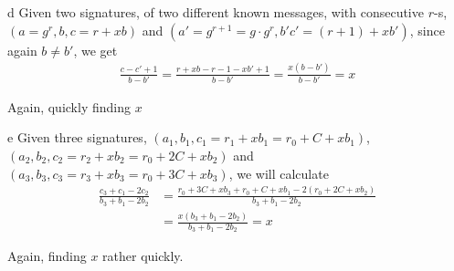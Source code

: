 \documentclass{article}
\begin{document}
\begin{paragraph}
    d Given two signatures, of two different known messages, with consecutive \(r\)-s, \((a = g^r, b, c = r + xb)\) and \((a' = g^{r + 1} = g \cdot g^r, b' c' = (r + 1) + xb')\), since again \(b \neq b'\), we get
    \begin{align*}
        \frac{c - c' + 1}{b - b'} = \frac{r + xb - r - 1 - xb' + 1}{b - b'} = \frac{x(b - b')}{b - b'} = x
    \end{align*}
    
    Again, quickly finding \(x\)
\end{paragraph}
\newpage

\begin{paragraph}
    e Given three signatures, \((a_1, b_1, c_1 = r_1 + xb_1 = r_0 + C + xb_1)\), \((a_2, b_2, c_2 = r_2 + xb_2 = r_0 + 2C + xb_2)\) and \((a_3, b_3, c_3 = r_3 + xb_3 = r_0 + 3C + xb_3)\), we will calculate
    \begin{align*}
        \frac{c_3 + c_1 - 2c_2}{b_3 + b_1 - 2b_2} &= \frac{r_0 + 3C + xb_3 + r_0 + C + xb_1 - 2(r_0 + 2C + xb_2)}{b_3 + b_1 - 2b_2}\\
        &= \frac{x(b_3 + b_1 - 2b_2)}{b_3 + b_1 - 2b_2} = x
    \end{align*}
    
    Again, finding \(x\) rather quickly.
\end{paragraph}
\end{document}
